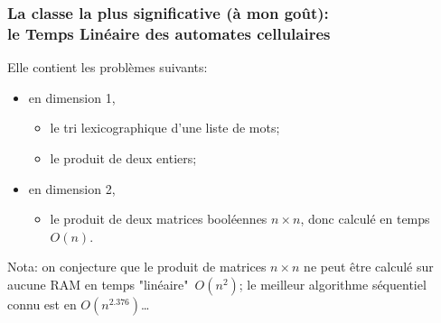 \documentclass[8pt]{beamer}
\begin{document}
{
  \frametitle{La classe la plus significative (à mon goût):\\
  le Temps Linéaire des automates cellulaires}
  
Elle contient les problèmes suivants:
 \begin{itemize}
 
\item en dimension 1,
 
\begin{itemize}
\item le tri lexicographique d'une liste de mots;
\item le produit de deux entiers;
\end{itemize}

\item en dimension 2, 
\begin{itemize}
\item le produit de deux matrices booléennes $n\times n$, donc calculé en temps $O(n)$.
\end{itemize}

\end{itemize}

\bigskip
Nota: on conjecture  que le produit de matrices $n\times n$ ne peut être calculé sur aucune RAM en temps "linéaire"~$O(n^2)$; le meilleur algorithme séquentiel connu est en $O(n^{2.376})$…
}
\end{document}
